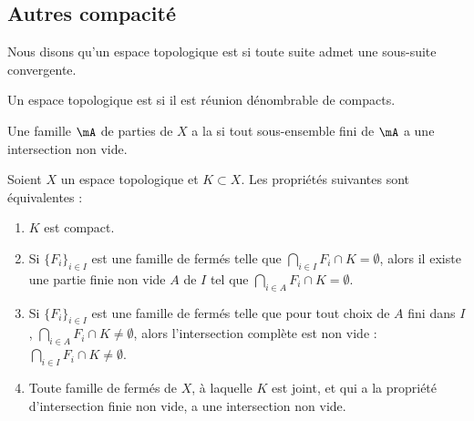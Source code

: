 \subsection{Autres compacité}

\begin{definition}        \label{DEFooTVDOooZbwOFK}
	Nous disons qu'un espace topologique est  si toute suite admet une sous-suite convergente.
\end{definition}

\begin{definition}      \label{DefFCGBooLpnSAK}
	Un espace topologique est  si il est réunion dénombrable de compacts.
\end{definition}

\begin{definition}
	Une famille \( \mA\) de parties de \( X\) a la  si tout sous-ensemble fini de \( \mA\) a une intersection non vide.
\end{definition}

\begin{proposition}\label{PropXKUMiCj}
	Soient \( X\) un espace topologique et \( K\subset X\). Les propriétés suivantes sont équivalentes :
	\begin{enumerate}
		\item\label{ItemXYmGHFai}
		      \( K\) est compact.
		\item\label{ItemXYmGHFaii}
		      Si \( \{ F_i \}_{i\in I}\) est une famille de fermés telle que \( \bigcap_{i\in I}F_i \cap K =\emptyset\), alors il existe une partie finie non vide \( A\) de \( I\) tel que \( \bigcap_{i\in A}F_i \cap K =\emptyset\).
		\item\label{ItemXYmGHFaiii}
		      Si \( \{ F_i \}_{i\in I}\) est une famille de fermés telle que pour tout choix de \( A\) fini dans \( I\), \( \bigcap_{i\in A}F_i \cap K \neq\emptyset\), alors l'intersection complète est non vide : \( \bigcap_{i\in I}F_i \cap K\neq\emptyset\).
		\item\label{ItemXYmGHFaiv}
		      Toute famille de fermés de \( X \), à laquelle \( K \) est joint, et qui a la propriété d'intersection finie non vide, a une intersection non vide.
	\end{enumerate}
\end{proposition}

